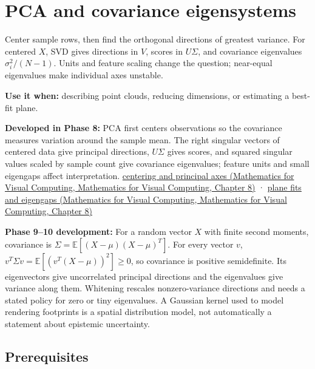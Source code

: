 \hypertarget{appendix-ad175ef3c5bf}{}\label{referencestart:appendix-ad175ef3c5bf}
\section{PCA and covariance eigensystems}\label{appendix-ad175ef3c5bf-pca-and-covariance-eigensystems}

Center sample rows, then find the orthogonal directions of greatest variance. For centered \(X\), SVD gives directions in \(V\), scores in \(U\Sigma\), and covariance eigenvalues \(\sigma_i^2/(N-1)\). Units and feature scaling change the question; near-equal eigenvalues make individual axes unstable.

\textbf{Use it when:} describing point clouds, reducing dimensions, or estimating a best-fit plane.

\textbf{Developed in Phase 8:} PCA first centers observations so the covariance measures variation around the sample mean. The right singular vectors of centered data give principal directions, \(U\Sigma\) gives scores, and squared singular values scaled by sample count give covariance eigenvalues; feature units and small eigengaps affect interpretation. \href{../02-Mathematics-for-Visual-Computing/main.pdf\#nameddest=02-foundations-ii-ch024-centered-measurements-reveal-principal-directions}{centering and principal axes (Mathematics for Visual Computing, Mathematics for Visual Computing, Chapter 8)} · \href{../02-Mathematics-for-Visual-Computing/main.pdf\#nameddest=02-foundations-ii-ch024-plane-fits-eigengaps-and-interpretation-of-uncertain-components}{plane fits and eigengaps (Mathematics for Visual Computing, Mathematics for Visual Computing, Chapter 8)}

\textbf{Phase 9--10 development:} For a random vector \(X\) with finite second moments, covariance is \(\Sigma=\mathbb E[(X-\mu)(X-\mu)^T]\). For every vector \(v\), \(v^T\Sigma v=\mathbb E[(v^T(X-\mu))^2]\geq0\), so covariance is positive semidefinite. Its eigenvectors give uncorrelated principal directions and the eigenvalues give variance along them. Whitening rescales nonzero-variance directions and needs a stated policy for zero or tiny eigenvalues. A Gaussian kernel used to model rendering footprints is a spatial distribution model, not automatically a statement about epistemic uncertainty.

\subsection{Prerequisites}\label{appendix-ad175ef3c5bf-prerequisites}

